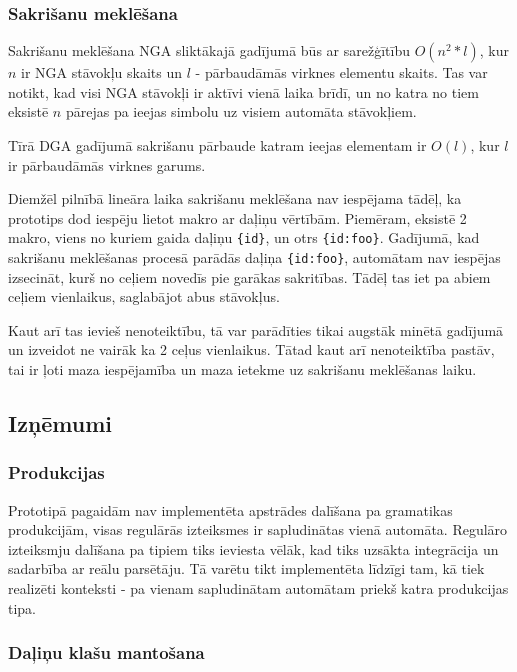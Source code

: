 \subsubsection{Sakrišanu meklēšana}
Sakrišanu meklēšana NGA sliktākajā gadījumā būs ar sarežģītību $O(n^2*l)$, kur $n$ ir NGA stāvokļu skaits un $l$ - pārbaudāmās virknes elementu skaits. Tas var notikt, kad visi NGA stāvokļi ir aktīvi vienā laika brīdī, un no katra no tiem eksistē $n$ pārejas pa ieejas simbolu uz visiem automāta stāvokļiem.

Tīrā DGA gadījumā sakrišanu pārbaude katram ieejas elementam ir $O(l)$, kur $l$ ir pārbaudāmās virknes garums. 

Diemžēl pilnībā lineāra laika sakrišanu meklēšana nav iespējama tādēļ, ka prototips dod iespēju lietot makro ar daļiņu vērtībām. Piemēram, eksistē 2 makro, viens no kuriem gaida daļiņu \verb|{id}|, un otrs \verb|{id:foo}|. Gadījumā, kad sakrišanu meklēšanas procesā parādās daļiņa \verb|{id:foo}|, automātam nav iespējas izsecināt, kurš no ceļiem novedīs pie garākas sakritības. Tādēļ tas iet pa abiem ceļiem vienlaikus, saglabājot abus stāvokļus.

Kaut arī tas ievieš nenoteiktību, tā var parādīties tikai augstāk minētā gadījumā un izveidot ne vairāk ka 2 ceļus vienlaikus. Tātad kaut arī nenoteiktība pastāv, tai ir ļoti maza iespējamība un maza ietekme uz sakrišanu meklēšanas laiku.

\subsection{\label{sbs:prot_problems}Izņēmumi}

\subsubsection{Produkcijas}

Prototipā pagaidām nav implementēta apstrādes dalīšana pa gramatikas produkcijām, visas regulārās izteiksmes ir sapludinātas vienā automāta. Regulāro izteiksmju dalīšana pa tipiem tiks ieviesta vēlāk, kad tiks uzsākta integrācija un sadarbība ar reālu parsētāju. Tā varētu tikt implementēta līdzīgi tam, kā tiek realizēti konteksti - pa vienam sapludinātam automātam priekš katra produkcijas tipa.

\subsubsection{Daļiņu klašu mantošana}

